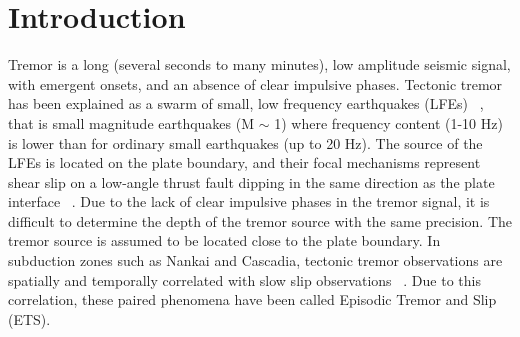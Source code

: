 \documentclass[draft]{agujournal2019}
\begin{document}

%
%
%
%


\section{Introduction}

Tremor is a long (several seconds to many minutes), low amplitude seismic signal, with emergent onsets, and an absence of clear impulsive phases. Tectonic tremor has been explained as a swarm of small, low frequency earthquakes (LFEs) ~\cite{SHE_2007_nature}, that is small magnitude earthquakes (M $\sim$ 1) where frequency content (1-10 Hz) is lower than for ordinary small earthquakes (up to 20 Hz). The source of the LFEs is located on the plate boundary, and their focal mechanisms represent shear slip on a low-angle thrust fault dipping in the same direction as the plate interface ~\cite{IDE_2007_GRL, ROY_2014}. Due to the lack of clear impulsive phases in the tremor signal, it is difficult to determine the depth of the tremor source with the same precision. The tremor source is assumed to be located close to the plate boundary. In subduction zones such as Nankai and Cascadia, tectonic tremor observations are spatially and temporally correlated with slow slip observations ~\cite{OBA_2002, ROG_2003}. Due to this correlation, these paired phenomena have been called Episodic Tremor and Slip (ETS). \\
\end{document}

